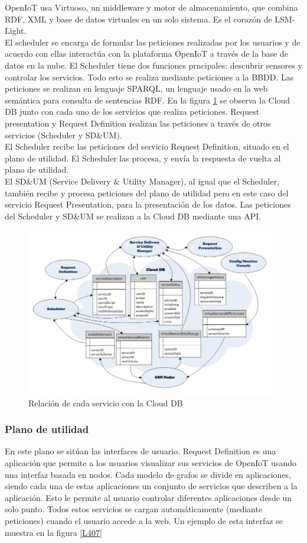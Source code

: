 \documentclass[12pt, twoside]{book}
\begin{document}
OpenIoT usa Virtuoso, un middleware y motor de almacenamiento, que combina RDF, XML y base de datos virtuales en un solo sistema. Es el corazón de LSM-Light. \\

El scheduler se encarga de formular las peticiones realizadas por los usuarios y de acuerdo con ellas interactúa con la plataforma OpenIoT a través de la base de datos en la nube. El Scheduler tiene dos funciones prncipales: descubrir sensores y controlar los servicios. Todo esto se realiza mediante peticiones a la BBDD. Las peticiones se realizan en lenguaje SPARQL, un lenguaje usado en la web semántica para consulta de sentencias RDF. En la figura \ref{L406} se observa la Cloud DB junto con cada uno de los servicios que realiza peticiones. Request presentation y Request Definition realizan las peticiones a través de otros servicios (Scheduler y SD\&UM).\\

El Scheduler recibe las peticiones del servicio Request Definition, situado en el plano de utilidad. El Scheduler las procesa, y envía la respuesta de vuelta al plano de utilidad.\\
El SD\&UM (Service Delivery \& Utility Manager), al igual que el Scheduler, también recibe y procesa peticiones del plano de utilidad pero en este caso del servicio Request Presentation, para la presentación de los datos. Las peticiones del Scheduler y SD\&UM se realizan a la Cloud DB mediante una API.
\begin{figure}[H]
\centering
\includegraphics[scale=0.4]{images/cloud_capture}
\caption{Relación de cada servicio con la Cloud DB}\label{L406}
\end{figure}
\subsubsection*{Plano de utilidad}
En este plano se sitúan las interfaces de usuario. 
Request Definition es una aplicación que permite a los usuarios visualizar sus servicios de OpenIoT usando una interfaz basada en nodos. Cada modelo de grafos se divide en aplicaciones, siendo cada una de estas aplicaciones un conjunto de servicios que describen a la aplicación. Esto le permite al usuario controlar diferentes aplicaciones desde un solo punto. Todos estos servicios se cargan automáticamente (mediante peticiones) cuando el usuario accede a la web. Un ejemplo de esta interfaz se muestra en la figura \ref{L407}
\end{document}
